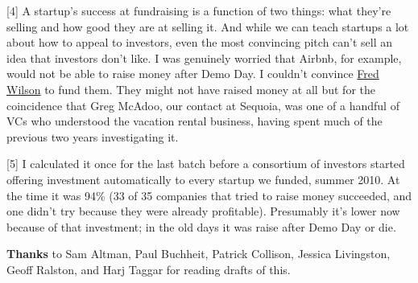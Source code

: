 [4] A startup's success at fundraising is a function of two
                    things: what they're selling and how good they are at
                    selling it. And while we can teach startups a lot about how
                    to appeal to investors, even the most convincing pitch can't
                    sell an idea that investors don't like. I was genuinely
                    worried that Airbnb, for example, would not be able to raise
                    money after Demo Day. I couldn't convince
                    \href{http://www.paulgraham.com/airbnb.html}{Fred Wilson} to fund them. They
                    might not have raised money at all but for the coincidence
                    that Greg McAdoo, our contact at Sequoia, was one of a
                    handful of VCs who understood the vacation rental business,
                    having spent much of the previous two years investigating
                    it.

[5] I calculated it once for the last batch before a
                    consortium of investors started offering investment
                    automatically to every startup we funded, summer 2010. At
                    the time it was 94\% (33 of 35 companies that tried to raise
                    money succeeded, and one didn't try because they were
                    already profitable). Presumably it's lower now because of
                    that investment; in the old days it was raise after Demo Day
                    or die.

\textbf{Thanks} to Sam Altman, Paul
                    Buchheit, Patrick Collison, Jessica Livingston, Geoff
                    Ralston, and Harj Taggar for reading drafts of this.



              
            
          
            
              
                


                  
              
            
          
